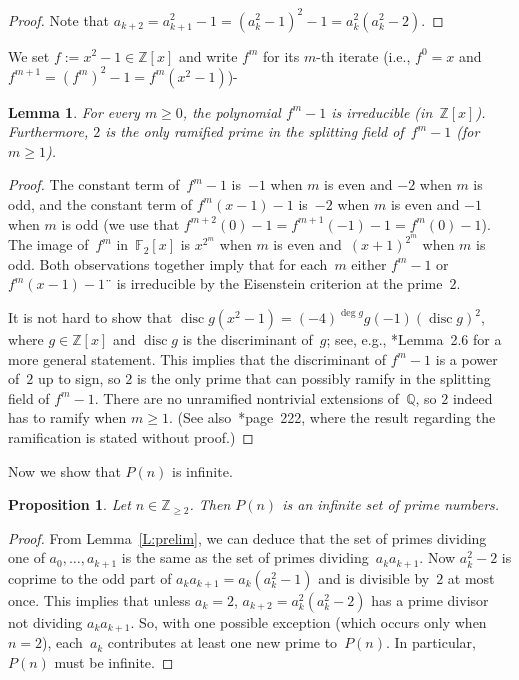 \documentclass[12pt,a4paper]{amsart}
\newcommand{\Z}{{\mathbb Z}}
\newcommand{\Q}{{\mathbb Q}}
\newcommand{\F}{{\mathbb F}}
\newcommand{\disc}{\operatorname{disc}}
\newtheorem{Lemma}[Theorem]{Lemma}
\newtheorem{Proposition}[Theorem]{Proposition}
\theoremstyle{definition}
\numberwithin{equation}{section}
\begin{document}
\begin{proof}
  Note that $a_{k+2} = a_{k+1}^2 - 1 = (a_k^2 - 1)^2 - 1 = a_k^2 (a_k^2 - 2)$.
\end{proof}

We set $f := x^2 - 1 \in \Z[x]$ and write $f^m$ for its $m$-th iterate
(i.e., $f^0 = x$ and $f^{m+1} = (f^m)^2 - 1 = f^m(x^2 - 1)$)-

\begin{Lemma} \label{L:irred}
  For every $m \geqslant 0$, the polynomial $f^m - 1$ is irreducible (in~$\Z[x]$).
  Furthermore, $2$ is the only ramified prime in the splitting field of~$f^m - 1$
  (for $m \geqslant 1$).
\end{Lemma}

\begin{proof}
  The constant term of~$f^m - 1$ is~$-1$ when $m$ is even and $-2$ when $m$ is odd,
  and the constant term of $f^m(x-1) - 1$ is~$-2$ when $m$ is even and $-1$
  when $m$ is odd (we use that $f^{m+2}(0) - 1 = f^{m+1}(-1) - 1 = f^m(0) - 1$).
  The image of~$f^m$ in~$\F_2[x]$ is $x^{2^m}$ when $m$ is even and~$(x + 1)^{2^m}$
  when $m$ is odd. Both observations together imply that for each~$m$
  either $f^m - 1$ or $f^m(x-1) - 1$¨ is irreducible by the Eisenstein criterion at the prime~$2$.

  It is not hard to show that $\disc g(x^2 - 1) = (-4)^{\deg g} g(-1) (\disc g)^2$,
  where $g \in \Z[x]$ and $\disc g$ is the discriminant of~$g$; see, e.g.,
  \cite{Jones}*{Lemma~2.6} for a more general statement. This implies that
  the discriminant of $f^m - 1$ is a power of~$2$ up to sign, so $2$ is the only
  prime that can possibly ramify in the splitting field of $f^m - 1$. There
  are no unramified nontrivial extensions of~$\Q$, so $2$ indeed has to ramify when $m \geqslant 1$.
  (See also~\cite{BJ}*{page~222}, where the result regarding the ramification
  is stated without proof.)
\end{proof}

Now we show that $P(n)$ is infinite.

\begin{Proposition}
  Let $n \in \Z_{\geqslant 2}$. Then $P(n)$ is an infinite set of prime numbers.
\end{Proposition}

\begin{proof}
  From Lemma~\ref{L:prelim}, we can deduce that the set of primes dividing one of
  $a_0, \ldots, a_{k+1}$ is the same as the set of primes dividing~$a_k a_{k+1}$.
  Now $a_k^2 - 2$ is coprime to the odd part of $a_k a_{k+1} = a_k (a_k^2 - 1)$ and is divisible
  by~$2$ at most once. This implies that unless $a_k = 2$, $a_{k+2} = a_k^2 (a_k^2 - 2)$
  has a prime divisor not dividing $a_k a_{k+1}$. So, with one possible exception
  (which occurs only when $n = 2$), each~$a_k$ contributes at least one new prime
  to~$P(n)$. In particular, $P(n)$ must be infinite.
\end{proof}
\end{document}
